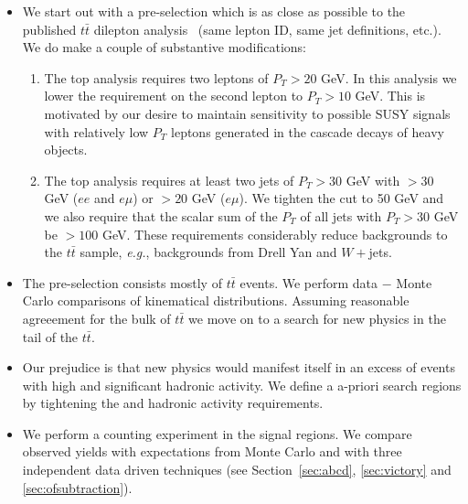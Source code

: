 \begin{itemize}

\item We start out with a pre-selection which is as close as 
possible to the published $t\bar{t}$
dilepton analysis~\cite{ref:top} (same lepton ID, same jet definitions,
etc.).  We do make a couple of substantive modifications:

\begin{enumerate}
\item The top analysis requires two leptons of $P_T > 20$ GeV.  
 In this
analysis we lower the requirement on the second lepton to $P_T > 10$ 
GeV.  This is motivated by our desire to maintain sensitivity to possible
SUSY signals with relatively low $P_T$ leptons generated in the 
cascade decays of heavy objects.
\item The top analysis requires at least two jets of $P_T > 30$
GeV with \met $>30$ GeV ($ee$ and $e\mu$) or \met $>20$ GeV ($e \mu$).
We tighten the \met cut to 50 GeV and we 
also require that the scalar sum of the $P_T$ of all jets with $P_T > 30$
GeV be $> 100$ GeV.  These requirements considerably
reduce backgrounds to the $t\bar{t}$ sample, {\em e.g.}, backgrounds
from Drell Yan and $W+$jets.
\end{enumerate}

\item The pre-selection consists mostly of $t\bar{t}$ events.  We perform 
data $-$ Monte Carlo comparisons of kinematical distributions.  Assuming
reasonable agreeement for the bulk of $t\bar{t}$ we move on to a 
search for new physics in the tail of the $t\bar{t}$.

\item Our prejudice is that new physics would manifest itself in an
excess of events with high \met and significant hadronic activity.
We define a a-priori search regions by tightening the \met and 
hadronic activity requirements.

\item We perform a counting experiment in the signal regions.  We compare
observed yields with expectations from Monte Carlo and with three independent
data driven techniques (see Section~\ref{sec:abcd}, \ref{sec:victory} and \ref{sec:ofsubtraction}).

\end{itemize}




